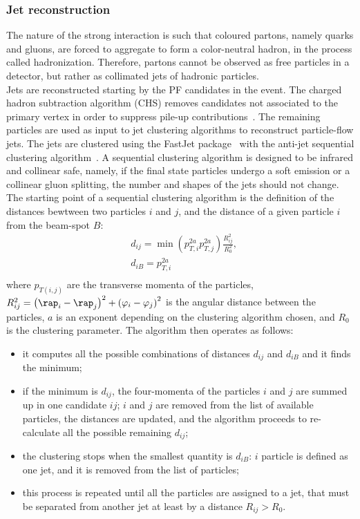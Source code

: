 \subsubsection{Jet reconstruction}
The nature of the strong interaction is such that coloured partons, namely quarks and gluons, are forced to aggregate to form a color-neutral hadron, in the process called hadronization. Therefore, partons cannot be observed as free particles in a detector, but rather as collimated jets of hadronic particles.\\
Jets are reconstructed starting by the PF candidates in the event. The charged hadron subtraction algorithm (CHS) removes candidates not associated to the primary vertex in order to suppress pile-up contributions~\cite{CMS-PAS-JME-14-001}. The remaining particles are used as input to jet clustering algorithms
to reconstruct particle-flow jets. The jets are clustered using the {\sc FastJet} package~\cite{Cacciari:2011ma} with the anti-\kt jet sequential clustering algorithm~\cite{Cacciari:2008gp}. A sequential clustering algorithm is designed to be infrared and collinear safe, namely, if the final state particles undergo a soft emission or a collinear gluon splitting, the number and shapes of the jets should not change. The starting point of a sequential clustering algorithm is the definition of the distances bewtween two particles $i$ and $j$, and the distance of a given particle $i$ from the beam-spot $B$:
\begin{equation}
\begin{split}
& d_{ij} = \min \left( p_{T,i}^{2a} p_{T,j}^{2a} \right) \frac{R_{ij}^2}{R_0^2},\\
& d_{iB} = p_{T,i}^{2a}\\
\end{split}
\label{eq:dist_akt}
\end{equation}
where $p_{T(i,j)}$ are the transverse momenta of the particles, $R_{ij}^2 = \left( \rap_i - \rap_j \right)^2 + \left( \varphi_i - \varphi_j\right)^2$ is the angular distance between the particles, $a$ is an exponent depending on the clustering algorithm chosen, and $R_0$ is the clustering parameter. The algorithm then operates as follows:
\begin{itemize}
\item it computes all the possible combinations of distances $d_{ij}$ and $d_{iB}$ and it finds the minimum;
\item if the minimum is $d_{ij}$, the four-momenta of the particles $i$ and $j$ are summed up in one candidate $ij$; $i$ and $j$ are removed from the list of available particles, the distances are updated, and the algorithm proceeds to re-calculate all the possible remaining $d_{ij}$;
\item the clustering stops when the smallest quantity is $d_{iB}$: $i$ particle is defined as one jet, and it is removed from the list of particles;
\item this process is repeated until all the particles are assigned to a jet, that must be separated from another jet at least by a distance $R_{ij} > R_0$.
\end{itemize}
